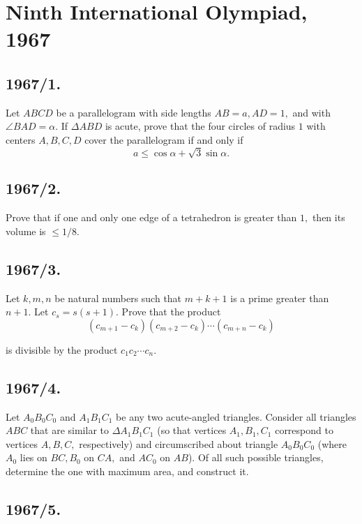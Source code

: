 \documentclass[12pt,thmsa]{article}
\begin{document}
\section{Ninth International Olympiad, 1967}

\subsection{1967/1.}

Let $ABCD$ be a parallelogram with side lengths $AB=a,AD=1,$ and with $%
\angle BAD=\alpha $. If $\Delta ABD$ is acute, prove that the four circles
of radius $1$ with centers $A,B,C,D$ cover the parallelogram if and only if
\[
a\leq \cos \alpha +\sqrt{3}\sin \alpha .
\]

\subsection{1967/2.}

Prove that if one and only one edge of a tetrahedron is greater than $1,$
then its volume is $\leq 1/8.$

\subsection{1967/3.}

Let $k,m,n$ be natural numbers such that $m+k+1$ is a prime greater than $%
n+1.$ Let $c_{s}=s(s+1).$ Prove that the product
\[
(c_{m+1}-c_{k})(c_{m+2}-c_{k})\cdots (c_{m+n}-c_{k})
\]

is divisible by the product $c_{1}c_{2}\cdots c_{n}$.

\subsection{1967/4.}

Let $A_{0}B_{0}C_{0}$ and $A_{1}B_{1}C_{1}$ be any two acute-angled
triangles. Consider all triangles $ABC$ that are similar to $\Delta
A_{1}B_{1}C_{1}$ (so that vertices $A_{1},B_{1},C_{1}$ correspond to
vertices $A,B,C,$ respectively) and circumscribed about triangle $%
A_{0}B_{0}C_{0}$ (where $A_{0}$ lies on $BC,B_{0}$ on $CA,$ and $AC_{0}$ on $%
AB$). Of all such possible triangles, determine the one with maximum area,
and construct it.

\subsection{1967/5.}
\end{document}
